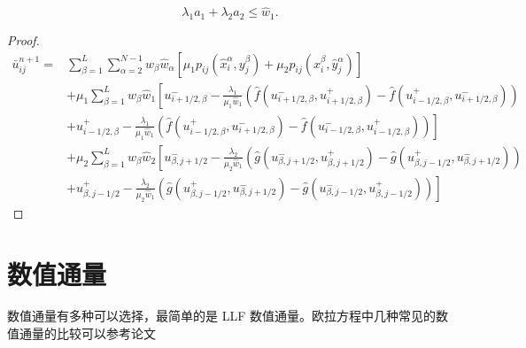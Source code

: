 \documentclass{book}
\begin{document}
\begin{equation}
    \lambda_{1} a_{1}+\lambda_{2} a_{2} \leq \hat{w}_{1} .
\end{equation}

\begin{proof}
    \begin{equation}
        \begin{aligned}
            \bar{u}_{i j}^{n+1}= & \sum_{\beta=1}^{L} \sum_{\alpha=2}^{N-1} w_{\beta} \hat{w}_{\alpha}\left[\mu_{1} p_{i j}\left(\hat{x}_{i}^{\alpha}, y_{j}^{\beta}\right)+\mu_{2} p_{i j}\left(x_{i}^{\beta}, \hat{y}_{j}^{\alpha}\right)\right]                                                                \\
                                 & +\mu_{1} \sum_{\beta=1}^{L} w_{\beta} \hat{w}_{1}\left[u_{i+1 / 2, \beta}^{-}-\frac{\lambda_{1}}{\mu_{1} \hat{w}_{1}}\left(\hat{f}\left(u_{i+1 / 2, \beta}^{-}, u_{i+1 / 2, \beta}^{+}\right)-\hat{f}\left(u_{i-1 / 2, \beta}^{+}, u_{i+1 / 2, \beta}^{-}\right)\right)\right. \\
                                 & \left.+u_{i-1 / 2, \beta}^{+}-\frac{\lambda_{1}}{\mu_{1} \hat{w}_{1}}\left(\hat{f}\left(u_{i-1 / 2, \beta}^{+}, u_{i+1 / 2, \beta}^{-}\right)-\hat{f}\left(u_{i-1 / 2, \beta}^{-}, u_{i-1 / 2, \beta}^{+}\right)\right)\right]                                                 \\
                                 & +\mu_{2} \sum_{\beta=1}^{L} w_{\beta} \hat{w}_{2}\left[u_{\beta, j+1 / 2}^{-}-\frac{\lambda_{2}}{\mu_{2} \hat{w}_{1}}\left(\hat{g}\left(u_{\beta, j+1 / 2}^{-}, u_{\beta, j+1 / 2}^{+}\right)-\hat{g}\left(u_{\beta, j-1 / 2}^{+}, u_{\beta, j+1 / 2}^{-}\right)\right)\right. \\
                                 & \left.+u_{\beta, j-1 / 2}^{+}-\frac{\lambda_{2}}{\mu_{2} \hat{w}_{1}}\left(\hat{g}\left(u_{\beta, j-1 / 2}^{+}, u_{\beta, j+1 / 2}^{-}\right)-\hat{g}\left(u_{\beta, j-1 / 2}^{-}, u_{\beta, j-1 / 2}^{+}\right)\right)\right]
        \end{aligned}
    \end{equation}
\end{proof}
\section{数值通量}
数值通量有多种可以选择，最简单的是 LLF 数值通量。欧拉方程中几种常见的数值通量的比较可以参考论文 \cite{numFlux1,numFlux2}
\end{document}
